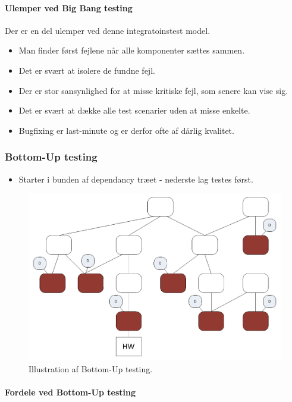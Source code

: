 \paragraph{Ulemper ved Big Bang testing}
Der er en del ulemper ved denne integratoinstest model.

\begin{itemize}
	\item Man finder først fejlene når alle komponenter sættes sammen.
	\item Det er svært at isolere de fundne fejl.
	\item Der er stor sansynlighed for at misse kritiske fejl, som senere kan vise sig. 
	\item Det er svært at dække alle test scenarier uden at misse enkelte.
	\item Bugfixing er last-minute og er derfor ofte af dårlig kvalitet.
\end{itemize}


\subsubsection{Bottom-Up testing}

\begin{itemize}
	\item Starter i bunden af dependancy træet - nederste lag testes først.
\end{itemize}

\begin{figure}
\centering
\includegraphics[width=0.7\linewidth]{figs/bottomUp.PNG}
\caption{Illustration af Bottom-Up testing.}
\label{fig:bottomUp}
\end{figure}

\paragraph{Fordele ved Bottom-Up testing}


